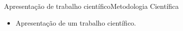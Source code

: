 \documentclass[t]{beamer}
\begin{document}

\begin{ftst}{Apresentação de trabalho científico}{Metodologia Científica}
\vone
\vone
\begin{itemize}
    \item Apresentação de um trabalho científico.
\end{itemize}


\end{ftst}

\end{document}

